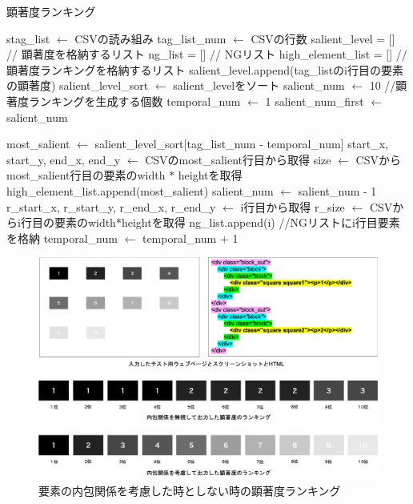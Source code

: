 \newpage
\begin{algorithm}[H]
  \small
  \caption{顕著度ランキング}
  \label{alg:lanking}
  \begin{algorithmic}

  \State stag\_list $ \leftarrow $ CSVの読み組み
  \State tag\_list\_num $ \leftarrow $ CSVの行数
  \State salient\_level = [] // 顕著度を格納するリスト
  \State ng\_list = [] // NGリスト
  \State high\_element\_list = [] // 顕著度ランキングを格納するリスト
    \State salient\_level.append(tag\_listのi行目の要素の顕著度)
  \EndFor    
  \State salient\_level\_sort $ \leftarrow $ salient\_levelをソート
  \State salient\_num $ \leftarrow $ 10 //顕著度ランキングを生成する個数
  \State temporal\_num $ \leftarrow $ 1
  \State salient\_num\_first $ \leftarrow $ salient\_num

    \State most\_salient $ \leftarrow $ salient\_level\_sort[tag\_list\_num - temporal\_num]
    \State start\_x, start\_y, end\_x, end\_y $\leftarrow$ CSVのmost\_salient行目から取得
    \State size $\leftarrow$ CSVからmost\_salient行目の要素のwidth $*$ heightを取得
    \State high\_element\_list.append(most\_salient)
    \State salient\_num $\leftarrow$ salient\_num - 1
    \State r\_start\_x, r\_start\_y, r\_end\_x, r\_end\_y $\leftarrow$ i行目から取得
    \State r\_size $\leftarrow$ CSVからi行目の要素のwidth*heightを取得
    \State ng\_list.append(i) //NGリストにi行目要素を格納
    \EndIf
    \EndIf
    \EndIf
    \EndFor 
    \EndIf
    \Else
    \State temporal\_num $\leftarrow$ temporal\_num $+$ 1
    \EndIf
  \EndWhile
  \end{algorithmic}
\end{algorithm}

\begin{figure}[H]
    \centering
    \includegraphics[width=12cm]{figures/06_rank.png}
    \caption{要素の内包関係を考慮した時としない時の顕著度ランキング}
    \label{fig_system4-rank}
\end{figure}

